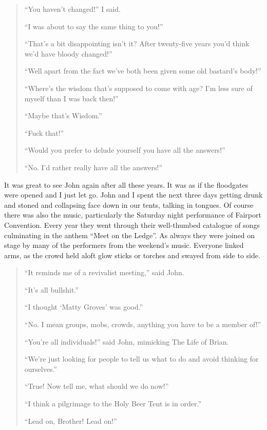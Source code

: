 \documentclass[12pt]{memoir}
\def\–{-\hskip0pt}
\begin{document}
\begin{quote}
“You haven’t changed!” I said.

“I was about to say the same thing to you!”

“That’s a bit disappointing isn’t it?
After twenty-five years you’d think we’d have bloody changed!”

“Well apart from the fact we’ve both been given some old bastard’s body!”

“Where’s the wisdom that’s supposed to come with age?
I’m less sure of myself than I was back then!”

“Maybe that’s Wisdom.”

“Fuck that!”

“Would you prefer to delude yourself you have all the answers!”

“No. I’d rather really have all the answers!”
\end{quote}

It was great to see John again after all these years.
It was as if the floodgates were opened and I just let go.
John and I spent the next three days getting drunk and stoned
and collapsing face down in our tents, talking in tongues.
Of course there was also the music,
particularly the Saturday night performance of Fairport Convention.
Every year they went through their well\–thumbed catalogue of songs
culminating in the anthem “Meet on the Ledge”.
As always they were joined on stage by many
of the performers from the weekend’s music.
Everyone linked arms, as the crowd held aloft glow sticks
or torches and swayed from side to side.

\begin{quote}
“It reminds me of a revivalist meeting,” said John.

“It’s all bullshit.”

“I thought ‘Matty Groves’ was good.”

“No. I mean groups, mobs, crowds, anything you have to be a member of!”

“You’re all individuals!” said John, mimicking The Life of Brian.

“We’re just looking for people to tell us
what to do and avoid thinking for ourselves.”

“True! Now tell me, what should we do now!”

“I think a pilgrimage to the Holy Beer Tent is in order.”

“Lead on, Brother! Lead on!”
\end{quote}


\end{document}
